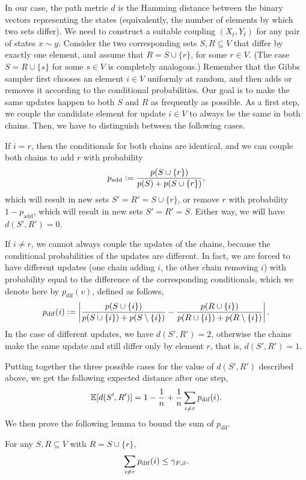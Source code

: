 In our case, the path metric $d$ is the Hamming distance between the binary vectors representing the states (equivalently, the number of elements by which two sets differ).
We need to construct a suitable coupling $(X_t, Y_t)$ for any pair of states $x \sim y$.
Consider the two corresponding sets $S, R \subseteq V$ that differ by exactly one element, and assume that $R = S \cup \{r\}$, for some $r \in V$. (The case $S = R \cup \{s\}$ for some $s \in V$ is completely analogous.)
Remember that the Gibbs sampler first chooses an element $i \in V$ uniformly at random, and then adds or removes it according to the conditional probabilities.
Our goal is to make the same updates happen to both $S$ and $R$ as frequently as possible.
As a first step, we couple the candidate element for update $i \in V$ to always be the same in both chains.
Then, we have to distinguish between the following cases.

If $i = r$, then the conditionals for both chains are identical, and we can couple both chains to add $r$ with probability
\begin{align*}
p_{\mathrm{add}} \vcentcolon= \frac{p(S \cup \{r\})}{p(S) + p(S \cup \{r\})},
\end{align*}
which will result in new sets $S' = R' = S \cup \{r\}$, or remove $r$ with probability $1 - p_{\mathrm{add}}$, which will result in new sets $S' = R' = S$.
Either way, we will have $d(S', R') = 0$.
  
If $i \neq r$, we cannot always couple the updates of the chains, because the conditional probabilities of the updates are different.
In fact, we are forced to have different updates (one chain adding $i$, the other chain removing $i$) with probability equal to the difference of the corresponding conditionals, which we denote here by $p_{\mathrm{dif}}(v)$, defined as follows,
\begin{align*}
  p_{\mathrm{dif}}(i) \vcentcolon= \left|\frac{p(S \cup \{i\})}{p(S \cup \{i\}) + p(S \setminus \{i\})} - \frac{p(R \cup \{i\})}{p(R \cup \{i\}) + p(R \setminus \{i\})}\right|.
\end{align*}
In the case of different updates, we have $d(S', R') = 2$, otherwise the chains make the same update and still differ only by element $r$, that is, $d(S', R') = 1$.

Putting together the three possible cases for the value of $d(S', R')$ described above, we get the following expected distance after one step,
\begin{align*}
  \mathbb{E}[d(S', R')] = 1 -\frac{1}{n} + \frac{1}{n}\sum_{i \neq r}p_{\mathrm{dif}}(i).
\end{align*}
We then prove the following lemma to bound the sum of $p_{\mathrm{dif}}$.
\begin{lemma}
For any $S, R \subseteq V$ with $R = S \cup \{r\}$,
\begin{align*}
  \sum_{i \neq r}p_{\mathrm{dif}}(i) \leq \gamma_{F,\beta}.
\end{align*}
\end{lemma}

